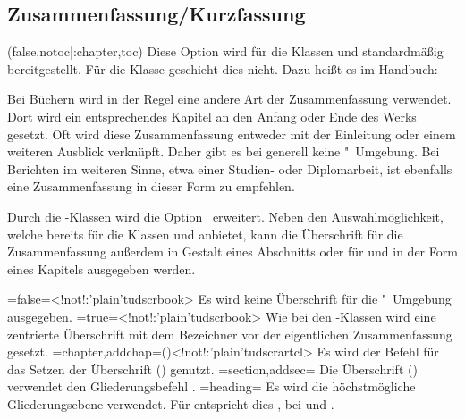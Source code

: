 \begin{DeclareEntity*}{}
\begin{DeclareEntity*}{}
\begin{DeclareEntity*}{}
\subsection{%
  Zusammenfassung/Kurzfassung%
}
%
\begin{Declaration}
  {}
  (false,notoc|:chapter,toc)
\printdeclarationlist
%
Diese Option wird für die Klassen  und  
standardmäßig bereitgestellt. Für die Klasse  geschieht dies 
nicht. Dazu heißt es im Handbuch:
%
\begin{quoting}
Bei Büchern wird in der Regel eine andere Art der Zusammenfassung verwendet. 
Dort wird ein entsprechendes Kapitel an den Anfang oder Ende des Werks gesetzt. 
Oft wird diese Zusammenfassung entweder mit der Einleitung oder einem weiteren 
Ausblick verknüpft. Daher gibt es bei  generell keine 
"~Umgebung. Bei Berichten im weiteren Sinne, etwa einer 
Studien- oder Diplomarbeit, ist ebenfalls eine Zusammenfassung in dieser Form 
zu empfehlen.
\end{quoting}
%
Durch die \TUDScript-Klassen wird die Option~ erweitert. 
Neben den Auswahlmöglichkeit, welche bereits \KOMAScript für die Klassen 
 und  anbietet, kann die Überschrift für 
die Zusammenfassung außerdem in Gestalt eines Abschnitts oder für 
 und  in der Form eines Kapitels 
ausgegeben werden.%
%
\begin{DeclareValues}
\itemval=false=<!not!:\Class'plain'{tudscrbook}>
  Es wird keine Überschrift für die "~Umgebung ausgegeben.
\itemval*=true=<!not!:\Class'plain'{tudscrbook}>
  Wie bei den \KOMAScript-Klassen wird eine zentrierte Überschrift mit dem 
  Bezeichner  vor der eigentlichen Zusammenfassung gesetzt.
\itemval=chapter,addchap=()<!not!:\Class'plain'{tudscrartcl}>
  Es wird der Befehl  für das Setzen der Überschrift 
  () genutzt. 
\itemval=section,addsec=
  Die Überschrift () verwendet den Gliederungsbefehl 
  .
\itemval=heading=
  Es wird die höchstmögliche Gliederungsebene verwendet. Für 
   entspricht dies , bei 
   und  .
\end{DeclareValues}


\end{Declaration}
\end{DeclareEntity*}
\end{DeclareEntity*}
\end{DeclareEntity*}

